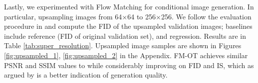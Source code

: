 \documentclass{article}
\def\ra{{\textnormal{a}}}
\renewcommand{\ra}[1]{\renewcommand{\arraystretch}{#1}}
\begin{document}
\begin{table}\vspace{-10pt}
\ra{1.05}
\setlength{\tabcolsep}{2.0pt}
\caption{Image super-resolution on the ImageNet validation set.}\label{tab:super_resolution}
\end{table} 
{Lastly, we experimented with Flow Matching for conditional image generation. In particular, upsampling images from 64$\times$64 to 256$\times$256.
We follow the evaluation procedure in \citep{saharia2022image} and compute the FID of the upsampled validation images; baselines include reference (FID of original validation set), and regression. Results are in Table \ref{tab:super_resolution}. Upsampled image samples are shown in Figures \ref{fig:upsampled_1}, \ref{fig:upsampled_2} in the Appendix. FM-OT achieves similar PSNR and SSIM values to \citep{saharia2022image} while considerably improving on FID and IS, which as argued by \citep{saharia2022image} is a better indication of generation quality.

}


\end{document}
